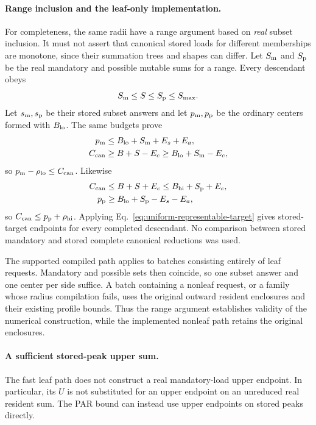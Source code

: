 \documentclass[11pt]{article}
\begin{document}
\paragraph{Range inclusion and the leaf-only implementation.}
For completeness, the same radii have a range argument based on \emph{real} subset inclusion. It must not assert that canonical stored loads for different memberships are monotone, since their summation trees and shapes can differ. Let $S_{\rm m}$ and $S_{\rm p}$ be the real mandatory and possible mutable sums for a range. Every descendant obeys
\begin{equation}
S_{\rm m}\le S\le S_{\rm p}\le S_{\max}.
\end{equation}
Let $s_{\rm m},s_{\rm p}$ be their stored subset answers and let $p_{\rm m},p_{\rm p}$ be the ordinary centers formed with $B_{\rm lo}$. The same budgets prove
\begin{align}
p_{\rm m}&\le B_{\rm lo}+S_{\rm m}+E_s+E_a,\\
C_{\rm can}&\ge B+S-E_c\ge B_{\rm lo}+S_{\rm m}-E_c,
\end{align}
so $p_{\rm m}-\rho_{\rm lo}\le C_{\rm can}$. Likewise
\begin{align}
C_{\rm can}&\le B+S+E_c\le B_{\rm hi}+S_{\rm p}+E_c,\\
p_{\rm p}&\ge B_{\rm lo}+S_{\rm p}-E_s-E_a,
\end{align}
so $C_{\rm can}\le p_{\rm p}+\rho_{\rm hi}$. Applying Eq.~\eqref{eq:uniform-representable-target} gives stored-target endpoints for every completed descendant. No comparison between stored mandatory and stored complete canonical reductions was used.

The supported compiled path applies to batches consisting entirely of leaf requests. Mandatory and possible sets then coincide, so one subset answer and one center per side suffice. A batch containing a nonleaf request, or a family whose radius compilation fails, uses the original outward resident enclosures and their existing profile bounds. Thus the range argument establishes validity of the numerical construction, while the implemented nonleaf path retains the original enclosures.

\paragraph{A sufficient stored-peak upper sum.}
The fast leaf path does not construct a real mandatory-load upper endpoint. In particular, its $U$ is not substituted for an upper endpoint on an unreduced real resident sum. The PAR bound can instead use upper endpoints on stored peaks directly.
\end{document}
